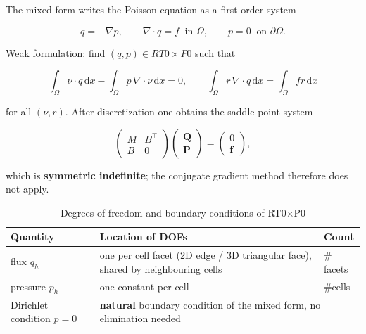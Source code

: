 \documentclass[11pt,oneside]{book}
\theoremstyle{definition}
\theoremstyle{plain}
\newcommand{\dif}{\,\mathrm{d}}
\begin{document}
The mixed form writes the Poisson equation as a first-order system

\begin{equation}
q=-\nabla p,\qquad \nabla\cdot q=f\ \text{ in }\Omega,\qquad
p=0\ \text{ on }\partial\Omega .
\label{eq:mixed}
\end{equation}

Weak formulation: find $(q,p)\in RT0\times P0$ such that

\begin{equation}
\int_\Omega \nu\cdot q\dif x-\int_\Omega p\,\nabla\cdot\nu\dif x=0,
\qquad
\int_\Omega r\,\nabla\cdot q\dif x=\int_\Omega f r\dif x
\label{eq:mixed-weak}
\end{equation}

for all $(\nu,r)$. After discretization one obtains the saddle-point system

\begin{equation}
\begin{pmatrix} M & B^{\top}\\ B & 0\end{pmatrix}
\begin{pmatrix} \mathbf{Q}\\ \mathbf{P}\end{pmatrix}
=\begin{pmatrix} 0\\ \mathbf{f}\end{pmatrix},
\label{eq:saddle}
\end{equation}

which is \textbf{symmetric indefinite}; the conjugate gradient method therefore does
not apply.

\begin{table}[htbp]
\centering
\caption{Degrees of freedom and boundary conditions of RT0$\times$P0}
\label{tab:rt0}
\begin{lrbox}{\guideTableBox}
\begin{tabular}{@{}lll@{}}
\toprule
Quantity & Location of DOFs & Count \\
\midrule
flux $q_h$ & one per cell facet (2D edge / 3D triangular face), shared by neighbouring cells & $\#$facets \\
pressure $p_h$ & one constant per cell & $\#$cells \\
\midrule
Dirichlet condition $p=0$ & \multicolumn{2}{l}{\textbf{natural} boundary condition of the mixed form, no elimination needed} \\
\bottomrule
\end{tabular}
\end{lrbox}%
\ifdim\wd\guideTableBox>\linewidth
  \resizebox{\linewidth}{!}{\usebox{\guideTableBox}}%
\else\usebox{\guideTableBox}\fi
\end{table}
\end{document}
